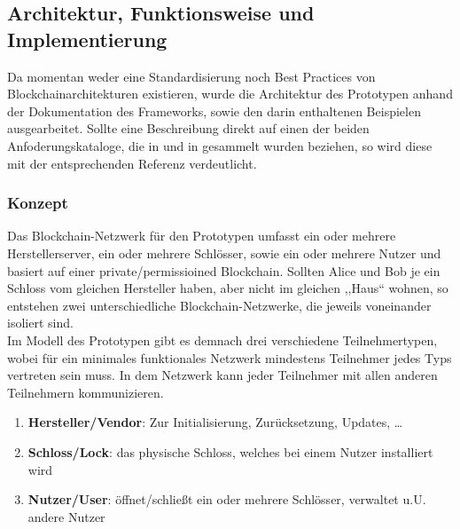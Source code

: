 \subsection{Architektur, Funktionsweise und Implementierung}
\label{sec:prototype_arch} 
    Da momentan weder eine Standardisierung noch Best Practices von Blockchainarchitekturen existieren, wurde die Architektur des Prototypen anhand der Dokumentation des Frameworks\cite{ComposerDocs}, sowie den darin enthaltenen Beispielen ausgearbeitet. 
    Sollte eine Beschreibung direkt auf einen der beiden Anfoderungskataloge, die in  und in  gesammelt wurden beziehen, so wird diese mit der entsprechenden Referenz verdeutlicht.
    
    \subsubsection{Konzept}
    \label{sec:prototype_arch_concept} 
        Das Blockchain-Netzwerk für den Prototypen umfasst ein oder mehrere Herstellerserver, ein oder mehrere Schlösser, sowie ein oder mehrere Nutzer und basiert auf einer private/permissioined Blockchain. 
        Sollten Alice und Bob je ein Schloss vom gleichen Hersteller haben, aber nicht im gleichen ,,Haus`` wohnen, so entstehen zwei unterschiedliche Blockchain-Netzwerke, die jeweils voneinander isoliert sind.
        \smallskip\\
        \noindent Im Modell des Prototypen gibt es demnach drei verschiedene Teilnehmertypen, wobei für ein minimales funktionales Netzwerk mindestens Teilnehmer jedes Typs vertreten sein muss. 
        In dem Netzwerk kann jeder Teilnehmer mit allen anderen Teilnehmern kommunizieren.
        \begin{enumerate}[noitemsep]
            \item \textbf{Hersteller/Vendor}: Zur Initialisierung, Zurücksetzung, Updates, \dots
            \item \textbf{Schloss/Lock}: das physische Schloss, welches bei einem Nutzer installiert wird
            \item \textbf{Nutzer/User}: öffnet/schließt ein oder mehrere Schlösser, verwaltet u.U. andere Nutzer
        \end{enumerate}
        
